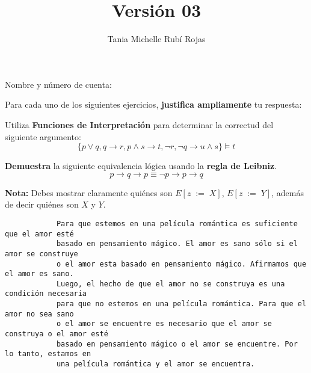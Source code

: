 \documentclass[oneside]{style}
\title{Versión 03}
\author{Tania Michelle Rubí Rojas}
\begin{document}
\maketitle

\vspace{5mm}
\noindent
Nombre y número de cuenta: \hrulefill\

\vspace*{5mm}
Para cada uno de los siguientes ejercicios, \textbf{justifica ampliamente} tu 
respuesta:

\begin{questions}[label=\protect\circled{\bfseries\arabic*}]

    \question
    {
        Utiliza \textbf{Funciones de Interpretación} para determinar la 
        correctud del siguiente argumento:
        \begin{equation*}
            \{p \lor q, q \rightarrow r, p \land s \rightarrow t, \neg r, 
            \neg q \rightarrow u \land s\} \models t
        \end{equation*} 

    }  
    
    \question
    {
        \textbf{Demuestra} la siguiente equivalencia lógica usando la 
        \textbf{regla de Leibniz}.
        \begin{equation*}
            p \rightarrow q \rightarrow p \equiv \neg p \rightarrow 
            p \rightarrow q
        \end{equation*}

        \textbf{Nota:} Debes mostrar claramente quiénes son $E[z \; := \; X]$, 
        $E[z \; := \; Y]$, además de decir quiénes son $X$ y $Y$. 
    }

    \question
    {
        \begin{verbatim}
            Para que estemos en una película romántica es suficiente que el amor esté 
            basado en pensamiento mágico. El amor es sano sólo si el amor se construye 
            o el amor esta basado en pensamiento mágico. Afirmamos que el amor es sano.
            Luego, el hecho de que el amor no se construya es una condición necesaria
            para que no estemos en una película romántica. Para que el amor no sea sano 
            o el amor se encuentre es necesario que el amor se construya o el amor esté 
            basado en pensamiento mágico o el amor se encuentre. Por lo tanto, estamos en 
            una película romántica y el amor se encuentra.
        \end{verbatim}

}
\end{questions}
\end{document}
